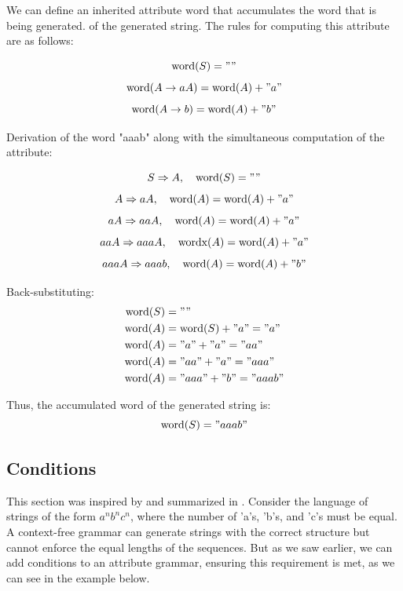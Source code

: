 We can define an inherited attribute \( \text{word} \) that accumulates the word that is being generated. of the generated string. The rules for computing this attribute are as follows:

\[ \text{word}(S) = "" \]
\[ \text{word}(A \rightarrow aA) = \text{word}(A) + "a" \]
\[ \text{word}(A \rightarrow b) = \text{word}(A) + "b" \]

Derivation of the word "aaab" along with the simultaneous computation of the attribute:

\[S \Rightarrow A , \quad  \text{word}(S) = "" \]
\[ A \Rightarrow aA , \quad  \text{word}(A) = \text{word}(A) + "a" \]
\[  aA \Rightarrow aaA , \quad \text{word}(A) = \text{word}(A) + "a" \]
\[  aaA \Rightarrow aaaA , \quad \text{wordx}(A) = \text{word}(A) + "a" \]
\[  aaaA \Rightarrow aaab , \quad  \text{word}(A) = \text{word}(A) + "b" \]

Back-substituting:
\[
\begin{aligned}
\text{word}(S) &= "" \\
\text{word}(A) &= \text{word}(S) + "a" = "a" \\
\text{word}(A) &= "a" + "a" = "aa" \\
\text{word}(A) &= "aa" + "a" = "aaa" \\
\text{word}(A) &= "aaa" + "b" = "aaab"
\end{aligned}
\]

Thus, the accumulated word of the generated string is:
\[
\text{word}(S) = "aaab"
\]

\subsection{Conditions}

This section was inspired by \cite{sebesta2019} and summarized in \cite{chapter}.
Consider the language of strings of the form \(a^n b^n c^n\), where the number of 'a's, 'b's, and 'c's must be equal. 
A context-free grammar can generate strings with the correct structure but cannot enforce the equal lengths of the sequences. 
But as we saw earlier, we can add conditions to an attribute grammar, ensuring this requirement is met, as we can see in the example below.

